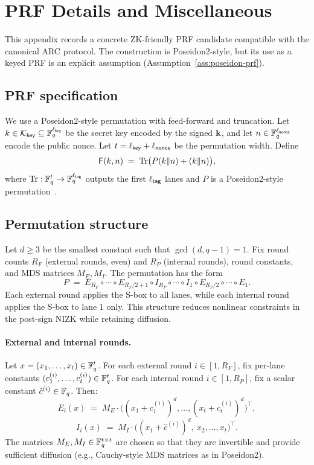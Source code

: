 \section{PRF Details and Miscellaneous}
\label{app:prf}

This appendix records a concrete ZK-friendly PRF candidate compatible with the canonical ARC protocol.  The
construction is Poseidon2-style, but its use as a keyed PRF is an explicit assumption
(Assumption~\ref{ass:poseidon-prf}).

\subsection{PRF specification}
We use a Poseidon2-style permutation with feed-forward and truncation. Let
\(k\in\mathcal K_{\mathsf{key}}\subseteq\mathbb{F}_q^{\ell_{\mathsf{key}}}\) be the secret key encoded by the signed
\(\mathbf{k}\), and let \(n\in\mathbb{F}_q^{\ell_{\mathsf{nonce}}}\) encode the public nonce. Let
\(t=\ell_{\mathsf{key}}+\ell_{\mathsf{nonce}}\) be the permutation width. Define
\[
  \mathsf{F}(k,n) \;=\; \mathrm{Tr}\big(P(k\Vert n) + (k\Vert n)\big),
\]
where \(\mathrm{Tr}:\mathbb{F}_q^{t}\to \mathbb{F}_q^{\ell_{\mathsf{tag}}}\) outputs the first \(\ell_{\mathsf{tag}}\) lanes and \(P\) is a
Poseidon2-style permutation~\cite{EPRINT:Poseidon2}.

\subsection{Permutation structure}
Let \(d\ge 3\) be the smallest constant such that \(\gcd(d,q-1)=1\). Fix round counts \(R_F\) (external rounds, even) and
\(R_P\) (internal rounds), round constants, and MDS matrices \(M_E,M_I\). The permutation has the form
\[
  P \;=\; E_{R_F}\circ\cdots\circ E_{R_F/2+1}\circ I_{R_P}\circ\cdots\circ I_{1}\circ E_{R_F/2}\circ\cdots\circ E_1.
\]
Each external round applies the S-box to all lanes, while each internal round applies the S-box to lane \(1\) only.
This structure reduces nonlinear constraints in the post-sign NIZK while retaining diffusion.

\paragraph{External and internal rounds.}
Let \(x=(x_1,\dots,x_t)\in\mathbb{F}_q^t\). For each external round \(i\in[1,R_F]\), fix per-lane constants
\((c^{(i)}_1,\dots,c^{(i)}_t)\in\mathbb{F}_q^t\). For each internal round \(i\in[1,R_P]\), fix a scalar constant \(\hat c^{(i)}\in\mathbb{F}_q\).
Then:
\[
  E_i(x) \;=\; M_E\cdot \bigl((x_1+c^{(i)}_1)^d,\dots,(x_t+c^{(i)}_t)^d\bigr)^\top,
\]
\[
  I_i(x) \;=\; M_I\cdot \bigl((x_1+\hat c^{(i)})^d,\ x_2,\dots,x_t\bigr)^\top.
\]
The matrices \(M_E,M_I\in\mathbb{F}_q^{t\times t}\) are chosen so that they are invertible and provide sufficient diffusion (e.g.,
Cauchy-style MDS matrices as in Poseidon2).

